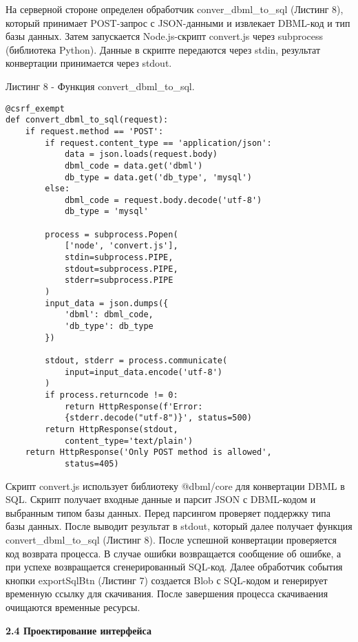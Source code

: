 На серверной стороне определен обработчик conver\_dbml\_to\_sql (Листинг 8), который принимает POST-запрос с JSON-данными и извлекает DBML-код и тип базы данных. Затем запускается Node.js-скрипт convert.js через subprocess (библиотека Python). Данные в скрипте передаются через stdin, результат конвертации принимается через stdout.

Листинг 8 - Функция convert\_dbml\_to\_sql.
\begin{lstlisting}[frame=single]
@csrf_exempt
def convert_dbml_to_sql(request):
    if request.method == 'POST':
        if request.content_type == 'application/json':
            data = json.loads(request.body)
            dbml_code = data.get('dbml')
            db_type = data.get('db_type', 'mysql')
        else:
            dbml_code = request.body.decode('utf-8')
            db_type = 'mysql'

        process = subprocess.Popen(
            ['node', 'convert.js'],
            stdin=subprocess.PIPE,
            stdout=subprocess.PIPE,
            stderr=subprocess.PIPE
        )
        input_data = json.dumps({
            'dbml': dbml_code,
            'db_type': db_type
        })

        stdout, stderr = process.communicate(
            input=input_data.encode('utf-8')
        )
        if process.returncode != 0:
            return HttpResponse(f'Error: 
            {stderr.decode("utf-8")}', status=500)
        return HttpResponse(stdout, 
            content_type='text/plain')
    return HttpResponse('Only POST method is allowed', 
            status=405)
\end{lstlisting}

Скрипт convert.js использует библиотеку @dbml/core для конвертации 
DBML в SQL. Скрипт получает входные данные и парсит JSON с DBML-кодом и выбранным типом базы данных. Перед парсингом проверяет поддержку типа базы данных. После выводит результат в stdout, который далее получает функция convert\_dbml\_to\_sql (Листинг 8). После успешной конвертации проверяется код возврата процесса. В случае ошибки возвращается сообщение об ошибке, а при успехе возвращается сгенерированный SQL-код. Далее обработчик события кнопки exportSqlBtn (Листинг 7) создается Blob с SQL-кодом и генерирует временную ссылку для скачивания. После завершения процесса скачиваения очищаются временные ресурсы.


\newpage
\textbf{\large 2.4 Проектирование интерфейса}

